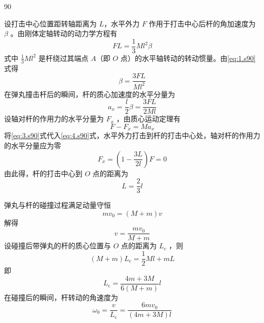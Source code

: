 \begin{solution}{90}
\begin{subsolution}
设打击中心位置距转轴距离为 $L$，水平外力 $F$ 作用于打击中心后杆的角加速度为 $\beta$ 。由刚体定轴转动的动力学方程有
\begin{equation}
F L = \frac {1}{3} M l ^ {2} \beta
\label{eq:1.s90}
\end{equation}
式中 $\frac{1}{3} M l^{2}$ 是杆绕过其端点 $A$（即 $O$ 点）的水平轴转动的转动惯量。由\eqref{eq:1.s90}式得
\begin{equation}
\beta = \frac {3 F L}{M l ^ {2}}
\label{eq:2.s90}
\end{equation}
在弹丸撞击杆后的瞬间，杆的质心加速度的水平分量为
\begin{equation}
a _ {x} = \frac {l}{2} \beta = \frac {3 F L}{2 M l}
\label{eq:3.s90}
\end{equation}
设轴对杆的作用力的水平分量为 $F_{x}$ ，由质心运动定理有
\begin{equation}
F - F _ {x} = M a _ {x}
\label{eq:4.s90}
\end{equation}
将\eqref{eq:3.s90}式代入\eqref{eq:4.s90}式，水平外力打击到杆的打击中心处，轴对杆的作用力的水平分量应为零
\begin{equation}
F _ {x} = \left(1 - \frac {3 L}{2 l}\right) F = 0
\label{eq:5.s90}
\end{equation}
由此得，杆的打击中心到 $O$ 点的距离为
\begin{equation}
L = \frac {2}{3} l
\label{eq:6.s90}
\end{equation}
\end{subsolution}
\begin{subsolution}
弹丸与杆的碰撞过程满足动量守恒
\begin{equation}
m v _ {0} = (M + m) v
\label{eq:7.s90}
\end{equation}
解得
\begin{equation}
v = \frac {m v _ {0}}{M + m}
\label{eq:8.s90}
\end{equation}
设碰撞后带弹丸的杆的质心位置与 $O$ 点的距离为 $L_{c}$ ，则
\begin{equation}
(M + m) L _ {\mathrm{c}} = \frac {1}{2} M l + m L
\label{eq:9.s90}
\end{equation}
即
\begin{equation}
L _ {\mathrm{c}} = \frac {4 m + 3 M}{6 (M + m)} l
\label{eq:10.s90}
\end{equation}
在碰撞后的瞬间，杆转动的角速度为
\begin{equation}
\omega_ {0} = \frac {v}{L _ {\mathrm{c}}} = \frac {6 m v _ {0}}{(4 m + 3 M) l}

\end{equation}
\end{subsolution}
\end{solution}
